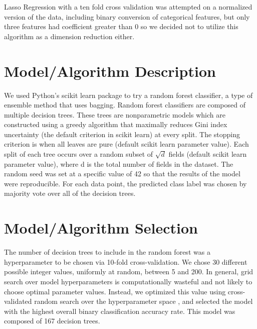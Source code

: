 \documentclass[twoside,11pt]{article}
\begin{document}
Lasso Regression with a ten fold cross validation was attempted on a normalized version of the data, including binary conversion of categorical features, but only three features had coefficient greater than 0 so we decided not to utilize this algorithm as a dimension reduction either.

\section{Model/Algorithm Description}
We used Python's scikit learn package to try a random forest classifier, a type of ensemble method that uses bagging. Random forest classifiers are composed of multiple decision trees. These trees are nonparametric models which are constructed using a greedy algorithm that maximally reduces Gini index uncertainty (the default criterion in scikit learn) at every split. The stopping criterion is when all leaves are pure (default scikit learn parameter value). Each split of each tree occurs over a random subset of $\sqrt{d}$ fields (default scikit learn parameter value), where d is the total number of fields in the dataset. The random seed was set at a specific value of 42 so that the results of the model were reproducible. For each data point, the predicted class label was chosen by majority vote over all of the decision trees.

\section{Model/Algorithm Selection}
The number of decision trees to include in the random forest was a hyperparameter to be chosen via 10-fold cross-validation. We chose 30 different possible integer values, uniformly at random, between 5 and 200. In general, grid search over model hyperparameters is computationally wasteful and not likely to choose optimal parameter values. Instead, we optimized this value using cross-validated random search over the hyperparameter space \citep{james12}, and selected the model with the highest overall binary classification accuracy rate. This model was composed of 167 decision trees.
\end{document}
